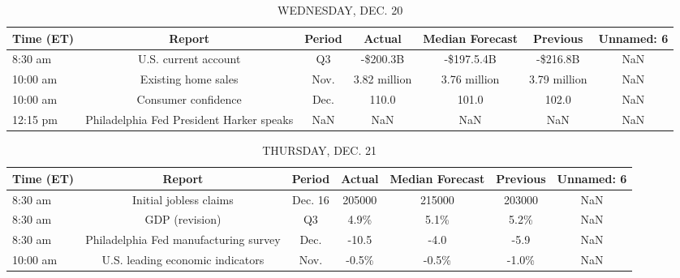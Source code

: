 \documentclass{article}%
\begin{document}
\begin{table}[htbp]%
\caption{WEDNESDAY, DEC. 20}%
\centering%
\begin{adjustbox}{width=1\textwidth}%
\begin{tabular}{lcccccc}
\toprule
Time (ET) &                                   Report & Period &       Actual & Median Forecast &     Previous & Unnamed: 6 \\
\midrule
  8:30 am &                     U.S. current account &     Q3 &     -\$200.3B &      -\$197.5.4B &     -\$216.8B &        NaN \\
 10:00 am &                      Existing home sales &   Nov. & 3.82 million &    3.76 million & 3.79 million &        NaN \\
 10:00 am &                      Consumer confidence &   Dec. &        110.0 &           101.0 &        102.0 &        NaN \\
 12:15 pm & Philadelphia Fed President Harker speaks &    NaN &          NaN &             NaN &          NaN &        NaN \\
\bottomrule
\end{tabular}
%
\end{adjustbox}%
\end{table}

%


\begin{table}[htbp]%
\caption{THURSDAY, DEC. 21}%
\centering%
\begin{adjustbox}{width=1\textwidth}%
\begin{tabular}{lcccccc}
\toprule
Time (ET) &                                Report &  Period & Actual & Median Forecast & Previous & Unnamed: 6 \\
\midrule
  8:30 am &                Initial jobless claims & Dec. 16 & 205000 &          215000 &   203000 &        NaN \\
  8:30 am &                        GDP (revision) &      Q3 &   4.9\% &            5.1\% &     5.2\% &        NaN \\
  8:30 am & Philadelphia Fed manufacturing survey &    Dec. &  -10.5 &            -4.0 &     -5.9 &        NaN \\
 10:00 am &      U.S. leading economic indicators &    Nov. &  -0.5\% &           -0.5\% &    -1.0\% &        NaN \\
\bottomrule
\end{tabular}
%
\end{adjustbox}%
\end{table}
\end{document}
